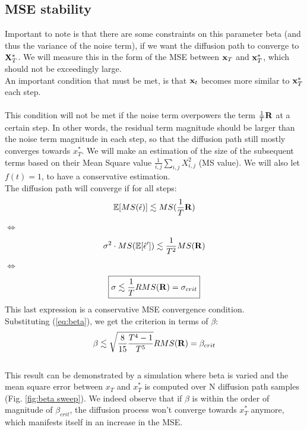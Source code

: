 \documentclass[twocolumn]{article}
\begin{document}
\begin{appendices}
\subsection{MSE stability}
Important to note is that there are some constraints on this parameter beta (and thus the variance of the noise term), if we want the diffusion path to converge to $\bold{X}_T^*$. We will measure this in the form of the MSE between $\bold{x}_T$ and $\bold{x}_T^*$, which should not be exceedingly large. \\
An important condition that must be met, is that $\bold{x}_t$ becomes more similar to $\bold{x}_T^*$ each step.\\
\\
 This condition will not be met if the noise term overpowers the term $\frac{1}{T}  \bold{R}$ at a certain step. In other words, the residual term magnitude should be larger than the noise term magnitude in each step, so that the diffusion path still mostly converges towards $x_T^*$. We will make an estimation of the size of the subsequent terms based on their Mean Square value $\frac{1}{i,j}\sum_{i,j} X_{i,j}^2$ (MS value). We will also let $f(t) = 1$, to have a conservative estimation.  \\
 The diffusion path will converge if for all steps:
\begin{equation}
    \mathbb{E}[MS(\hat{\epsilon})] \lesssim MS(\frac{1}{T} \bold{R})
\end{equation}
$\Leftrightarrow$
 \begin{equation}
    \sigma^2 \cdot MS(\mathbb{E}[\hat{\epsilon}']) \lesssim \frac{1}{T^2} MS(\bold{R})
\end{equation}
$\Leftrightarrow$
 \begin{equation}
    \boxed{\sigma \lesssim \frac{1}{T} RMS(\bold{R}) = \sigma_{crit}}
\end{equation}
This last expression is a conservative MSE convergence condition. \\
Substituting (\ref{eq:beta}), we get the criterion in terms of $\beta$:
\begin{equation}
    \beta \lesssim \sqrt{\frac{8}{15} \frac{T^4-1}{T^5}} RMS(\bold{R}) = \beta_{crit}
\end{equation}
\\
This result can be demonstrated by a simulation where beta is varied and the mean square error between $x_T$ and $x_T^*$ is computed over N diffusion path samples (Fig. \ref{fig:beta sweep}). We indeed observe that if $\beta$ is within the order of magnitude of $\beta_{crit}$, the diffusion process won't converge towards $x_T^*$ anymore, which manifests itself in an increase in the MSE. 

\end{appendices}
\end{document}
